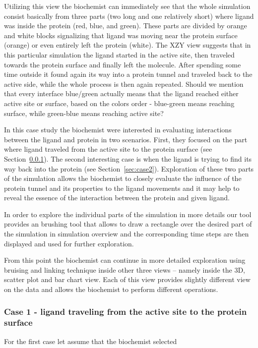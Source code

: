\documentclass[twocolumn]{bmcart}%
\begin{document}
Utilizing this view the biochemist can immediately see that the whole simulation consist basically from three parts (two long and one relatively short) where ligand was inside the protein (red, blue, and green).
These parts are divided by orange and white blocks signalizing that ligand was moving near the protein surface (orange) or even entirely left the protein (white). 
The {\color{red}XZY}  view suggests that in this particular simulation the ligand started in the active site, then traveled towards the protein surface and finally left the molecule.
After spending some time outside it found again its way into a protein tunnel and traveled back to the active side, while the whole process is then again repeated. 
{\color{red}Should we mention that every interface blue/green actually means that the ligand reached either active site or surface, based on the colors order - blue-green means reaching surface, while green-blue means reaching active site?} 

In this case study the biochemist were interested in evaluating interactions between the ligand and protein in two scenarios. 
First, they focused on the part where ligand traveled from the active site to the protein surface (see Section~\ref{sec:case1}). 
The second interesting case is when the ligand is trying to find its way back into the protein (see Section~\ref{sec:case2}).
Exploration of these two parts of the simulation allows the biochemist to closely evaluate the influence of the protein tunnel and its properties to the ligand movements and it may help to reveal the essence of the interaction between the protein and given ligand.

In order to explore the individual parts of the simulation in more details our tool provides an brushing tool that allows to draw a rectangle over the desired part of the simulation in simulation overview and the corresponding time steps are then displayed and used for further exploration.

From this point the biochemist can continue in more detailed exploration using bruising and linking technique inside other three views -- namely inside the 3D, scatter plot and bar chart view.
Each of this view provides slightly different view on the data and allows the biochemist to perform different operations.

\subsubsection{Case 1 - ligand traveling from the active site to the protein surface}
\label{sec:case1}
For the first case let assume that the biochemist selected 
\end{document}
